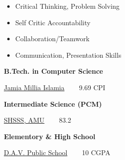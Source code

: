 \documentclass[10pt,a4paper,ragged2e,withhyper]{altacv}
\begin{document}
\begin{paracol}{2}
\begin{itemize}
    \item {Critical Thinking}, {Problem Solving}
    \item {Self Critic} {Accountability}
    \item {Collaboration/Teamwork}
    \item {Communication}, {Presentation Skills}
\end{itemize}


\textbf{B.Tech. in Computer Science}

\textcolor{VividPurple}{\href{https://www.jmi.ac.in}{Jamia Millia Islamia}} ~~~ 9.69 CPI

\textbf{Intermediate Science (PCM)}

\textcolor{VividPurple}{\href{https://www.amu.ac.in/schools/saiyyid-hamid-senior-secondary-school-boys/home-page}{SHSSS, AMU}} ~~~ 83.2%

\textbf{Elementory \& High School}

\textcolor{VividPurple}{\href{http://davntpc.org}{D.A.V. Public School}} ~~~ 10 CGPA

\end{paracol}
\end{document}

